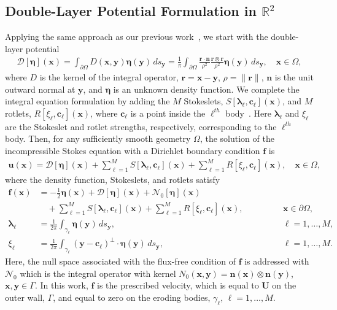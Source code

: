 \documentclass[3p]{elsarticle}
\newcommand{\bd}{{\partial}}
\newcommand{\cc}{{\mathbf{c}}}
\newcommand{\DDD}{{\boldsymbol{\mathcal D}}}
\newcommand{\eeta}{{\boldsymbol\eta}}
\newcommand{\ff}{{\mathbf{f}}}
\newcommand{\llambda}{{\boldsymbol\lambda}}
\newcommand{\nn}{{\mathbf{n}}}
\newcommand{\NN}{{\mathcal{N}}}
\newcommand{\rr}{{\mathbf{r}}}
\newcommand{\RR}{{\mathbb{R}}}
\newcommand{\uu}{{\mathbf{u}}}
\newcommand{\UU}{{\mathbf{U}}}
\newcommand{\xx}{{\mathbf{x}}}
\newcommand{\yy}{{\mathbf{y}}}
\begin{document}
\subsection{Double-Layer Potential Formulation in $\RR^2$}
Applying the same approach as our previous work~\citep{qua-moo2018}, we
start with the double-layer potential 
\begin{align}
  \DDD[\eeta](\xx) = \int_{\bd\Omega} D(\xx,\yy) \eeta(\yy)\, ds_\yy = 
  \frac{1}{\pi}\int_{\bd\Omega} 
    \frac{\rr \cdot \nn}{\rho^2} \frac{\rr \otimes \rr}{\rho^2}
    \eeta(\yy) \, ds_\yy, \quad \xx \in \Omega,
  \label{eqn:velocityDLP}
\end{align}
where $D$ is the kernel of the integral operator, $\rr = \xx - \yy$,
$\rho = \|\rr\|$, $\nn$ is the unit outward normal at $\yy$, and $\eeta$
is an unknown density function.  We complete the integral equation
formulation by adding the $M$ Stokeslets,
$S[\llambda_\ell,\cc_\ell](\xx)$, and $M$ rotlets,
$R[\xi_\ell,\cc_\ell](\xx)$, where $\cc_\ell$ is a point inside the
$\ell^{th}$ body~\citep{pow-mir1987}.  Here $\llambda_\ell$ and
$\xi_\ell$ are the Stokeslet and rotlet strengths, respectively,
corresponding to the $\ell^{th}$ body.  Then, for any sufficiently
smooth geometry $\Omega$, the solution of the incompressible Stokes
equation with a Dirichlet boundary condition $\ff$ is
\begin{align}
  \uu(\xx) = \DDD[\eeta](\xx) + 
    \sum_{\ell=1}^M S[\llambda_\ell,\cc_\ell](\xx) + 
    \sum_{\ell=1}^M R[\xi_\ell,\cc_\ell](\xx), \quad \xx \in \Omega,
\end{align}
where the density function, Stokeslets, and rotlets satisfy
\begin{subequations}
\label{eqn:BIE}
\begin{alignat}{3}
  \ff(\xx) &= -\frac{1}{2}\eeta(\xx) + \DDD[\eeta](\xx) + 
    \NN_0[\eeta](\xx) \nonumber \\
    &\quad + \sum_{\ell=1}^M S[\llambda_\ell,\cc_\ell](\xx) + 
    \sum_{\ell=1}^M R[\xi_\ell,\cc_\ell](\xx), 
    \quad &&\qquad\xx \in \bd\Omega, \\
  \llambda_\ell &= \frac{1}{2\pi} \int_{\gamma_\ell} 
    \eeta(\yy)\, ds_\yy, &&\qquad \ell = 1,\ldots,M, \\
  \xi_\ell &= \frac{1}{2\pi} \int_{\gamma_\ell}
    (\yy - \cc_\ell)^\perp \cdot \eeta(\yy)\, ds_\yy, 
    &&\qquad \ell = 1,\ldots,M.
\end{alignat}
\end{subequations}
Here, the null space associated with the flux-free condition of $\ff$ is
addressed with  $\NN_0$ which is the integral operator with kernel
$N_0(\xx,\yy) = \nn(\xx) \otimes \nn(\yy)$, $\xx,\yy \in \Gamma$.  In
this work, $\ff$ is the prescribed velocity, which is equal to $\UU$ on
the outer wall, $\Gamma$, and equal to zero on the eroding bodies,
$\gamma_\ell$, $\ell=1,\ldots,M$.
\end{document}

